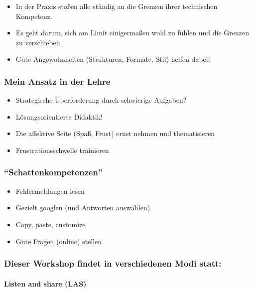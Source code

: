\documentclass[
  ngerman,
]{article}
\providecommand{\tightlist}{%
  \setlength{\itemsep}{0pt}\setlength{\parskip}{0pt}}
\begin{document}
\begin{itemize}
\tightlist
\item
  In der Praxis stoßen alle ständig an die Grenzen ihrer technischen Kompetenz.
\item
  Es geht darum, sich am Limit einigermaßen wohl zu fühlen und die Grenzen zu verschieben.
\item
  Gute Angewohnheiten (Strukturen, Formate, Stil) helfen dabei!
\end{itemize}

\hypertarget{mein-ansatz-in-der-lehre}{%
\subsubsection{Mein Ansatz in der Lehre}\label{mein-ansatz-in-der-lehre}}

\begin{itemize}
\tightlist
\item
  Strategische Überforderung durch schwierige Aufgaben?
\item
  Lösungsorientierte Didaktik!
\item
  Die affektive Seite (Spaß, Frust) ernst nehmen und thematisieren
\item
  Frustrationsschwelle trainieren
\end{itemize}

\hypertarget{schattenkompetenzen}{%
\subsubsection{``Schattenkompetenzen''}\label{schattenkompetenzen}}

\begin{itemize}
\tightlist
\item
  Fehlermeldungen lesen
\item
  Gezielt googlen (und Antworten auswählen)
\item
  Copy, paste, customize
\item
  Gute Fragen (online) stellen
\end{itemize}

\hypertarget{dieser-workshop-findet-in-verschiedenen-modi-statt}{%
\subsubsection{Dieser Workshop findet in verschiedenen Modi statt:}\label{dieser-workshop-findet-in-verschiedenen-modi-statt}}

\hypertarget{listen-and-share-las}{%
\paragraph{Listen and share (LAS)}\label{listen-and-share-las}}
\end{document}

